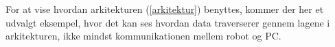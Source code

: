 
For at vise hvordan arkitekturen (\cref{arkitektur})  benyttes, kommer der her et udvalgt eksempel, hvor det kan ses hvordan data traverserer gennem lagene i arkitekturen, ikke mindst kommunikationen mellem robot og PC.


